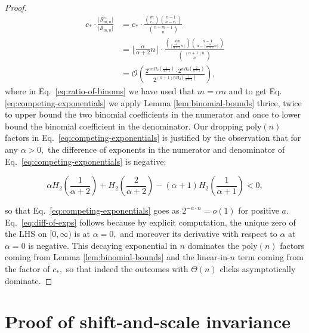 \documentclass[11pt]{article}
\theoremstyle{plain}
\theoremstyle{plain}
\theoremstyle{plain}
\theoremstyle{plain}
\theoremstyle{plain}
\theoremstyle{plain}
\theoremstyle{plain}
\theoremstyle{remark}
\theoremstyle{remark}
\theoremstyle{plain}
\theoremstyle{plain}
\theoremstyle{plain}
\theoremstyle{plain}
\newcommand{\Smn}{\mathcal{S}_{m,n}}
\newcommand\poly[1]{\mathrm{poly}(#1)}
\begin{document}
\begin{proof}
\begin{align}
c_\ast \cdot \frac{ \vert \Smn^{c_\ast}\vert}{\vert\Smn\vert} &= c_\ast \cdot \frac{\binom{m}{c_\ast} \binom{n-1}{n-c_\ast}}{\binom{n+m-1}{n}} 
\\[1em]&= 
\lfloor \frac{\alpha}{\alpha+2}n \rfloor \cdot \frac{\binom{~\alpha n~}{\lfloor \frac{\alpha}{\alpha+2}n \rfloor} \binom{~~n-1~~}{n - \lfloor \frac{\alpha}{\alpha+2}n \rfloor}}{\binom{~(\alpha+1)n~}{n}} \label{eq:ratio-of-binoms}
\\[1em]&= \mathcal{O}\left(\frac{2^{\alpha nH_2(\frac{1}{\alpha+2})} \cdot 2^{nH_2(\frac{2}{\alpha+2}
)}}{2^{(\alpha+1)nH_2(\frac{1}{\alpha+1})}}\right), \label{eq:competing-exponentials}
\end{align}
where in Eq.~\ref{eq:ratio-of-binoms} we have used that $m=\alpha n$ and to get Eq. \ref{eq:competing-exponentials} we apply Lemma \ref{lem:binomial-bounds} thrice, twice to upper bound the two binomial coefficients in the numerator and once to lower bound the binomial coefficient in the denominator. Our dropping $\poly{n}$ factors in Eq.~\ref{eq:competing-exponentials} is justified by the observation that for any $\alpha>0,$ the difference of exponents in the numerator and denominator of Eq.~\ref{eq:competing-exponentials} is negative:

\begin{equation}\label{eq:diff-of-exps}
\alpha H_2(\frac{1}{\alpha+2}) + H_2(\frac{2}{\alpha+2}) - (\alpha+1)H_2(\frac{1}{\alpha+1}) < 0,
\end{equation}

so that Eq.~\ref{eq:competing-exponentials} goes as $2^{-a\cdot n} = o(1)$ for positive $a.$
Eq.~\ref{eq:diff-of-exps} follows because by explicit computation, the unique zero of the LHS on $[0,\infty)$ is at $\alpha=0,$ and moreover its derivative with respect to $\alpha$ at $\alpha=0$ is negative. This decaying exponential in $n$ dominates the $\poly{n}$ factors coming from Lemma \ref{lem:binomial-bounds} and the linear-in-$n$ term coming from the factor of $c_\ast,$ so that indeed the outcomes with $\Theta(n)$ clicks asymptotically dominate. 

\end{proof}

\newpage
\section{Proof of shift-and-scale invariance}\label{sec:appx-invariance-pf}
\appxinvariance*
\end{document}
